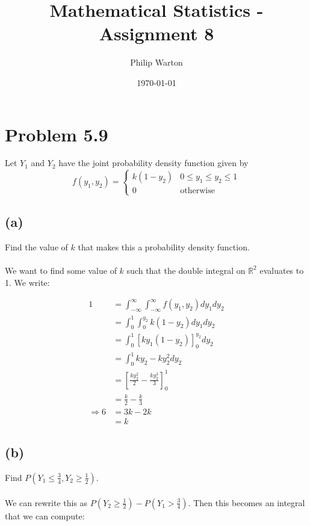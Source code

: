 \documentclass{article}
\theoremstyle{definition}
\begin{document}
\title{Mathematical Statistics - Assignment 8}
\author{Philip Warton}
\date{\today}
\maketitle

\section*{Problem 5.9}
    Let $Y_1$ and $Y_2$ have the joint probability density function given by
    \[
        f(y_1,y_2) =
        \begin{cases}
            k(1-y_2) & 0 \leqslant y_1 \leqslant y_2 \leqslant 1 \\
            0 & \text{otherwise}
        \end{cases}
    \]

    \subsection*{(a)}
        Find the value of $k$ that makes this a probability density function. \\\\
        We want to find some value of $k$ such that the double integral on $\mathbb{R}^2$
        evaluates to 1. We write:

        \begin{align*}
            1 &= \int_{-\infty}^\infty \int_{-\infty}^\infty f(y_1,y_2) dy_1 dy_2 \\
              &= \int_0^1 \int_0^{y_2} k(1-y_2) dy_1 dy_2 \\
              &= \int_0^1 \left[ k y_1 (1 - y_2) \right]_0^{y_2} dy_2 \\
              &= \int_0^1 k y_2 - k y_2^2 dy_2 \\
              &= \left[ \frac{k y_2^2}{2} - \frac{k y_2^3}{3} \right]_0^1 \\
              &= \frac{k}{2} - \frac{k}{3} \\
            \Longrightarrow 
            6 &= 3k - 2k \\
              & = k
        \end{align*}

    \subsection*{(b)}
        Find $P(Y_1 \leqslant \frac{3}{4}, Y_2 \geqslant \frac{1}{2})$. \\\\
        We can rewrite this as $P(Y_2 \geqslant \frac{1}{2}) - P(Y_1 > \frac{3}{4})$.
        Then this becomes an integral that we can compute:
\end{document}
